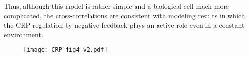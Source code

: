 Thus, although this model is rather simple and a biological cell much more complicated, %
the cross-correlations are consistent with modeling results 
in which the CRP-regulation by negative feedback plays an active role even in a constant environment.
%
%



%


\begin{figure}	
	\centering	
	\texttt{[image: CRP-fig4\_v2.pdf]}	
	\clearpage %
\end{figure}	

\clearpage

